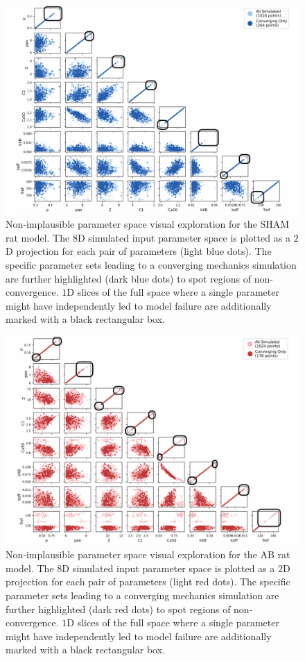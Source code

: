 \begin{figure}[ht!]
    \myfloatalign
    \includegraphics[width=\textwidth]{figures/chapter09/conv_vs_nonconv_sham.pdf}
    \caption{Non-implausible parameter space visual exploration for the SHAM rat model. The $8$D simulated input parameter space is plotted as a $2$D projection for each pair of parameters (light blue dots). The specific parameter sets leading to a converging mechanics simulation are further highlighted (dark blue dots) to spot regions of non-convergence. $1$D slices of the full space where a single parameter might have independently led to model failure are additionally marked with a black rectangular box.}
    \label{fig:shamnimpspaceexamined}
\end{figure}

\begin{figure}[ht!]
    \myfloatalign
    \includegraphics[width=\textwidth]{figures/chapter09/conv_vs_nonconv_ab.pdf}
    \caption{Non-implausible parameter space visual exploration for the AB rat model. The $8$D simulated input parameter space is plotted as a $2$D projection for each pair of parameters (light red dots). The specific parameter sets leading to a converging mechanics simulation are further highlighted (dark red dots) to spot regions of non-convergence. $1$D slices of the full space where a single parameter might have independently led to model failure are additionally marked with a black rectangular box.}
    \label{fig:abnimpspaceexamined}
\end{figure}


